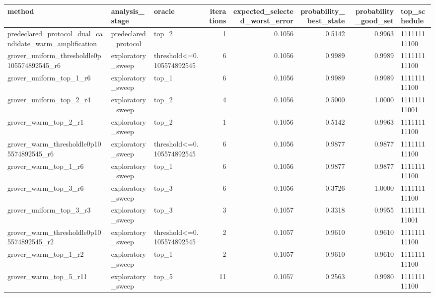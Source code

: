 \begin{tabular}{lllrrrrl}
\toprule
method & analysis\_stage & oracle & iterations & expected\_selected\_worst\_error & probability\_best\_state & probability\_good\_set & top\_schedule \\
\midrule
predeclared\_protocol\_dual\_candidate\_warm\_amplification & predeclared\_protocol & top\_2 & 1 & 0.1056 & 0.5142 & 0.9963 & 111111111100 \\
grover\_uniform\_thresholdle0p105574892545\_r6 & exploratory\_sweep & threshold<=0.105574892545 & 6 & 0.1056 & 0.9989 & 0.9989 & 111111111100 \\
grover\_uniform\_top\_1\_r6 & exploratory\_sweep & top\_1 & 6 & 0.1056 & 0.9989 & 0.9989 & 111111111100 \\
grover\_uniform\_top\_2\_r4 & exploratory\_sweep & top\_2 & 4 & 0.1056 & 0.5000 & 1.0000 & 111111111001 \\
grover\_warm\_top\_2\_r1 & exploratory\_sweep & top\_2 & 1 & 0.1056 & 0.5142 & 0.9963 & 111111111100 \\
grover\_warm\_thresholdle0p105574892545\_r6 & exploratory\_sweep & threshold<=0.105574892545 & 6 & 0.1056 & 0.9877 & 0.9877 & 111111111100 \\
grover\_warm\_top\_1\_r6 & exploratory\_sweep & top\_1 & 6 & 0.1056 & 0.9877 & 0.9877 & 111111111100 \\
grover\_warm\_top\_3\_r6 & exploratory\_sweep & top\_3 & 6 & 0.1056 & 0.3726 & 1.0000 & 111111111100 \\
grover\_uniform\_top\_3\_r3 & exploratory\_sweep & top\_3 & 3 & 0.1057 & 0.3318 & 0.9955 & 111111111001 \\
grover\_warm\_thresholdle0p105574892545\_r2 & exploratory\_sweep & threshold<=0.105574892545 & 2 & 0.1057 & 0.9610 & 0.9610 & 111111111100 \\
grover\_warm\_top\_1\_r2 & exploratory\_sweep & top\_1 & 2 & 0.1057 & 0.9610 & 0.9610 & 111111111100 \\
grover\_warm\_top\_5\_r11 & exploratory\_sweep & top\_5 & 11 & 0.1057 & 0.2563 & 0.9980 & 111111111100 \\
\bottomrule
\end{tabular}
